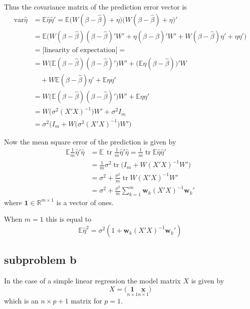 \documentclass[a4paper]{article}
\newcommand{\w}{\mathbf{w}}
\newcommand{\e}{\mathbf{1}}
\newcommand{\Real}{\mathbb{R}}
\newcommand{\Ex}{\mathbb{E}}
\newcommand{\Var}{\text{var}}
\newcommand{\Tr}{\mathop{\text{tr}}\nolimits}
\begin{document}
Thus the covariance matrix of the prediction error vector is
\begin{align*}
	\Var \hat{\eta} &= \Ex \hat{\eta}\hat{\eta}'
	= \Ex\big(W (\beta - \hat{\beta}) + \eta\big)\big(W (\beta - \hat{\beta}) + \eta\big)'\\
	&= \Ex \big( W (\beta - \hat{\beta})(\beta - \hat{\beta})'W' + \eta (\beta - \hat{\beta})'W' + W (\beta - \hat{\beta}) \eta' + \eta \eta' \big)\\
	&= \Big[ \text{linearity of expectation} \Big] = \\
	&= W \big( \Ex (\beta - \hat{\beta})(\beta - \hat{\beta})' \big) W' + \big( \Ex \eta(\beta - \hat{\beta}) \big)'W \\
		& \quad + W \Ex(\beta - \hat{\beta}) \eta' + \Ex \eta \eta' \\
	&= W \big( \Ex (\beta - \hat{\beta})(\beta - \hat{\beta})' \big) W' + \Ex\eta\eta' \\
	&= W \big( \sigma^2 (X'X)^{-1} \big) W' + \sigma^2 I_m \\
	&= \sigma^2 \Big( I_m + W \big( \sigma^2 (X'X)^{-1} \big) W' \Big)
\end{align*}

Now the mean square error of the prediction is given by
\begin{align*}
	\Ex \frac{1}{m}\hat{\eta}' \hat{\eta}
	&= \Ex\, \Tr \frac{1}{m} \hat{\eta}'\hat{\eta} 
	 = \frac{1}{m} \Tr \Ex \hat{\eta} \hat{\eta}' \\
	&= \frac{1}{m} \sigma^2 \Tr \big( I_m + W (X'X)^{-1} W' ) \\
	&= \sigma^2 + \frac{\sigma^2}{m} \Tr W (X'X)^{-1} W' \\
	&= \sigma^2 + \frac{\sigma^2}{m} \sum_{k=1}^m \w_k (X'X)^{-1} \w_k'
\end{align*}
where $\e\in \Real^{m\times 1}$ is a vector of ones.

When $m=1$ this is equal to
\[ \Ex \hat{\eta}^2 = \sigma^2( 1 + \w_k (X'X)^{-1} \w_k' ) \]


\subsection{subproblem b} %
\label{sub:subproblem_b}

In the case of a simple linear regression the model matrix $X$ is given by
\[X = \big( \underset{n\times 1}{\e} \underset{n\times 1}{\mathbf{x}} \big)\]
which is an $n\times p+1$ matrix for $p=1$.
\end{document}
